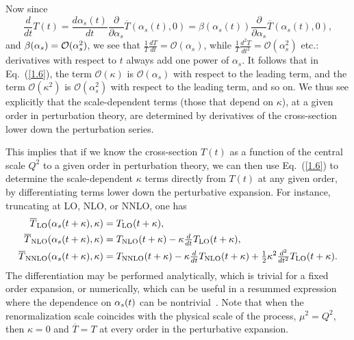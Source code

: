 Now since
\begin{equation} \label{1.7}
	\frac{d}{dt} T(t) = \frac{d \alpha_s(t)}{dt} \frac{\partial}{\partial \alpha_s} \overline{T}(\alpha_s(t), 0) = \beta(\alpha_s(t)) \frac{\partial}{\partial \alpha_s} \overline{T}(\alpha_s(t), 0),
\end{equation}
%
and $\beta(\alpha_s) = \mathcal{O}(\alpha_s^2)$, we see that 
$\frac{1}{T} \frac{dT}{dt}
= \mathcal{O}(\alpha_s)$, while $\frac{1}{T} \frac{d^2T}{dt^2} =
\mathcal{O}(\alpha_s^2)$ etc.: derivatives with respect to $t$ always
add one power of $\alpha_s$. It follows that in Eq.~(\ref{1.6}), the term
$\mathcal{O}(\kappa)$ is $\mathcal{O}(\alpha_s)$ with respect to the
leading term, and the term $\mathcal{O}(\kappa^2)$ is
$\mathcal{O}(\alpha_s^2)$ with respect to the leading term, and so
on.
We thus see explicitly that
the scale-dependent terms (those that depend on $\kappa$), 
at a given order in perturbation theory, are
determined by derivatives of the cross-section lower down the
perturbation series.  

This implies that if we know the cross-section $T(t)$ as a function of the central 
scale $Q^2$ to a given order in perturbation theory, we can then use 
Eq.~(\ref{1.6}) to determine the scale-dependent 
$\kappa$ terms directly from $T(t)$ at any given order,  by 
differentiating terms lower down the perturbative expansion.
%
For instance, truncating at LO, NLO, or NNLO, one has
%
\begin{align} \label{1.8}
\begin{split}
	\overline{T}_{\text{LO}}(\alpha_s(t + \kappa), \kappa) & = T_{\text{LO}}(t + \kappa), \\
	\overline{T}_{\text{NLO}}(\alpha_s(t + \kappa), \kappa) & = T_{\text{NLO}}(t + \kappa) - \kappa\hbox{${{d}\over {dt}}$}{T}_{\text{LO}}(t + \kappa), \\
	\overline{T}_{\text{NNLO}}(\alpha_s(t + \kappa), \kappa) & = T_{\text{NNLO}}(t + \kappa) - \kappa\hbox{${{d}\over {dt}}$}{T}_{\text{NLO}}(t + \kappa) + \hbox{${{1}\over {2}}$}\kappa^2  \hbox{${{d^2}\over {dt^2}}$}{T}_{\text{LO}}(t + \kappa).
\end{split}
\end{align}
%
The differentiation may be performed analytically,
which is trivial for a fixed 
order expansion, or numerically, which can be useful in a resummed expression
where the dependence on $\alpha_s(t)$ can be
nontrivial~\cite{Altarelli:2008aj}.
%
Note that when the renormalization scale coincides
with the physical scale of the process, $\mu^2=Q^2$, then $\kappa=0$
and $\overline{T}=T$ at every order in the perturbative expansion.

